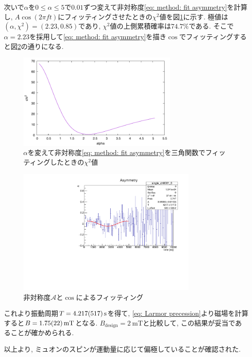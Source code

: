 \documentclass[dvipdfmx]{jsarticle}
\begin{document}
次いで$\alpha$を$0\leq\alpha\leq5$で$0.01$ずつ変えて非対称度\eqref{eq: method: fit asymmetry}を計算し, $A\cos(2\pi ft)$にフィッティングさせたときの$\chi^2$値を図\ref{fig: result: alpha and chi square}に示す.
極値は$(\alpha,\chi^2)=(2.23, 0.85)$であり, $\chi^2$値の上側累積確率は$74.7\%$である.
そこで$\alpha=2.23$を採用して\eqref{eq: method: fit asymmetry}を描き$\cos$でフィッティングすると図\ref{fig: result: asymmetry}の通りになる.

\begin{figure}
    \centering
    \includegraphics[width=8cm]{../img/results/alpha-chi2.pdf}
    \caption{$\alpha$を変えて非対称度\eqref{eq: method: fit asymmetry}を三角関数でフィッティングしたときの$\chi^2$値}
    \label{fig: result: alpha and chi square}
\end{figure}

\begin{figure}
    \centering
    \includegraphics[width=9cm]{../img/results/asymmetry.pdf}
    \caption{非対称度$\mathscr{A}$と$\cos$によるフィッティング}
    \label{fig: result: asymmetry}
\end{figure}

これより振動周期$T=\SI{4.217\pm0.517}{\second}$を得て, \eqref{eq: Larmor precession}より磁場を計算すると$B=\SI{1.75+-0.22}{\milli\tesla}$となる.
$B_{\text{design}}=\SI{2}{\milli\tesla}$と比較して, この結果が妥当であることが確かめられる.

以上より, ミュオンのスピンが運動量に応じて偏極していることが確認された.
\end{document}
